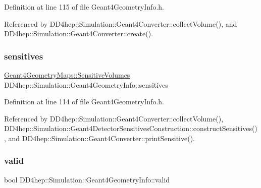 Definition at line 115 of file Geant4\+Geometry\+Info.\+h.



Referenced by D\+D4hep\+::\+Simulation\+::\+Geant4\+Converter\+::collect\+Volume(), and D\+D4hep\+::\+Simulation\+::\+Geant4\+Converter\+::create().

\hypertarget{class_d_d4hep_1_1_simulation_1_1_geant4_geometry_info_ab8c6e7272ad7cf326e06e5ea1f200418}{}\label{class_d_d4hep_1_1_simulation_1_1_geant4_geometry_info_ab8c6e7272ad7cf326e06e5ea1f200418} 
\subsubsection{\texorpdfstring{sensitives}{sensitives}}
{\footnotesize\ttfamily \hyperlink{namespace_d_d4hep_1_1_simulation_1_1_geant4_geometry_maps_a4b4bd41ff250c41737c7a73223fab910}{Geant4\+Geometry\+Maps\+::\+Sensitive\+Volumes} D\+D4hep\+::\+Simulation\+::\+Geant4\+Geometry\+Info\+::sensitives}



Definition at line 114 of file Geant4\+Geometry\+Info.\+h.



Referenced by D\+D4hep\+::\+Simulation\+::\+Geant4\+Converter\+::collect\+Volume(), D\+D4hep\+::\+Simulation\+::\+Geant4\+Detector\+Sensitives\+Construction\+::construct\+Sensitives(), and D\+D4hep\+::\+Simulation\+::\+Geant4\+Converter\+::print\+Sensitive().

\hypertarget{class_d_d4hep_1_1_simulation_1_1_geant4_geometry_info_a0bc71f53d762f58ec47c76dc5db8b075}{}\label{class_d_d4hep_1_1_simulation_1_1_geant4_geometry_info_a0bc71f53d762f58ec47c76dc5db8b075} 
\subsubsection{\texorpdfstring{valid}{valid}}
{\footnotesize\ttfamily bool D\+D4hep\+::\+Simulation\+::\+Geant4\+Geometry\+Info\+::valid}




